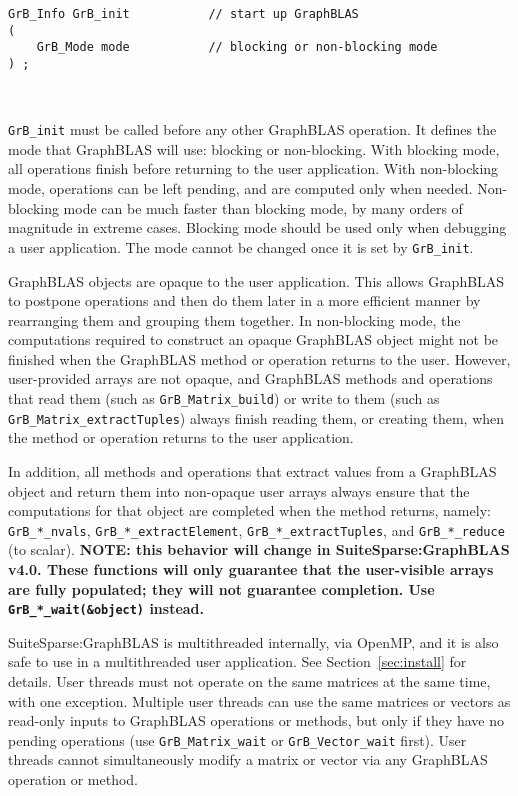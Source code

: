 \documentclass[12pt]{article}
\begin{document}
\begin{mdframed}[userdefinedwidth=6in]
{\footnotesize
\begin{verbatim}
GrB_Info GrB_init           // start up GraphBLAS
(
    GrB_Mode mode           // blocking or non-blocking mode
) ;
\end{verbatim}
}\end{mdframed}

\hypertarget{link:init}{\mbox{ }}%
\verb'GrB_init' must be called before any other GraphBLAS operation.  It
defines the mode that GraphBLAS will use:  blocking or non-blocking.  With
blocking mode, all operations finish before returning to the user application.
With non-blocking mode, operations can be left pending, and are computed only
when needed.  Non-blocking mode can be much faster than blocking mode, by many
orders of magnitude in extreme cases.  Blocking mode should be used only when
debugging a user application.  The mode cannot be changed once it is set by
\verb'GrB_init'.

GraphBLAS objects are opaque to the user application.  This allows GraphBLAS to
postpone operations and then do them later in a more efficient manner by
rearranging them and grouping them together.  In non-blocking mode, the
computations required to construct an opaque GraphBLAS object might not be
finished when the GraphBLAS method or operation returns to the user.  However,
user-provided arrays are not opaque, and GraphBLAS methods and operations that
read them (such as \verb'GrB_Matrix_build') or write to them (such as
\verb'GrB_Matrix_extractTuples') always finish reading them, or creating them,
when the method or operation returns to the user application.

In addition, all methods and operations that extract values from a GraphBLAS
object and return them into non-opaque user arrays always ensure that the
computations for that object are completed when the method returns, namely:
\verb'GrB_*_nvals', \verb'GrB_*_extractElement', \verb'GrB_*_extractTuples',
and \verb'GrB_*_reduce' (to scalar).
{\bf NOTE: this behavior will change in SuiteSparse:GraphBLAS v4.0.  These
functions will only guarantee that the user-visible arrays are fully populated;
they will not guarantee completion.  Use \verb'GrB_*_wait(&object)' instead.}

SuiteSparse:GraphBLAS is multithreaded internally, via OpenMP, and it is also
safe to use in a multithreaded user application.  See Section~\ref{sec:install}
for details.
User threads must not operate on the same matrices at the same time, with one
exception.  Multiple user threads can use the same matrices or vectors as
read-only inputs to GraphBLAS operations or methods, but only if they have no
pending operations (use \verb'GrB_Matrix_wait' or \verb'GrB_Vector_wait'
first).  User threads cannot simultaneously modify a matrix or vector via any
GraphBLAS operation or method.
\end{document}
